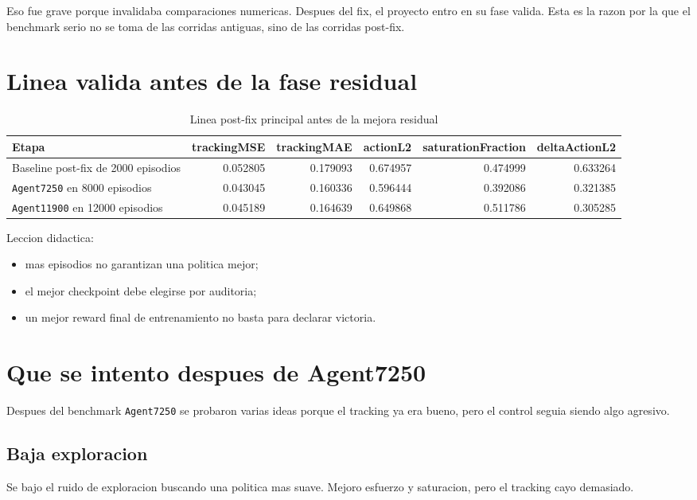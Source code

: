 \documentclass[11pt,a4paper]{article}
\begin{document}
Eso fue grave porque invalidaba comparaciones numericas. Despues del fix, el proyecto entro en su fase valida. Esta es la razon por la que el benchmark serio no se toma de las corridas antiguas, sino de las corridas post-fix.

\section{Linea valida antes de la fase residual}

\begin{table}[H]
\centering
\caption{Linea post-fix principal antes de la mejora residual}
\begin{tabular}{lrrrrr}
\toprule
Etapa & trackingMSE & trackingMAE & actionL2 & saturationFraction & deltaActionL2 \\
\midrule
Baseline post-fix de 2000 episodios & 0.052805 & 0.179093 & 0.674957 & 0.474999 & 0.633264 \\
\texttt{Agent7250} en 8000 episodios & 0.043045 & 0.160336 & 0.596444 & 0.392086 & 0.321385 \\
\texttt{Agent11900} en 12000 episodios & 0.045189 & 0.164639 & 0.649868 & 0.511786 & 0.305285 \\
\bottomrule
\end{tabular}
\end{table}

Leccion didactica:
\begin{itemize}[leftmargin=1.5em]
\item mas episodios no garantizan una politica mejor;
\item el mejor checkpoint debe elegirse por auditoria;
\item un mejor reward final de entrenamiento no basta para declarar victoria.
\end{itemize}

\section{Que se intento despues de Agent7250}

Despues del benchmark \texttt{Agent7250} se probaron varias ideas porque el tracking ya era bueno, pero el control seguia siendo algo agresivo.

\subsection{Baja exploracion}
Se bajo el ruido de exploracion buscando una politica mas suave. Mejoro esfuerzo y saturacion, pero el tracking cayo demasiado.
\end{document}
